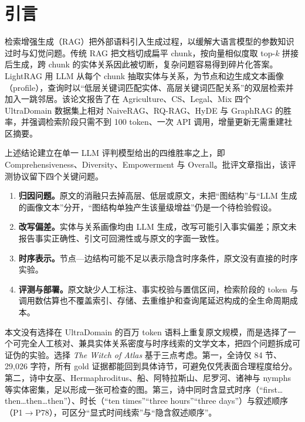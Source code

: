 \documentclass[11pt,a4paper]{ctexart}
\begin{document}
\section{引言}

检索增强生成（RAG）把外部语料引入生成过程，以缓解大语言模型的参数知识过时与幻觉问题\citep{lewis2020rag}。传统 RAG 把文档切成扁平 chunk，按向量相似度取 top-$k$ 拼接后生成，跨 chunk 的实体关系因此被切断，复杂问题容易得到碎片化答案。LightRAG\citep{guo2024lightrag} 用 LLM 从每个 chunk 抽取实体与关系，为节点和边生成文本画像（profile），查询时以“低层关键词匹配实体、高层关键词匹配关系”的双层检索并加入一跳邻居。该论文报告了在 Agriculture、CS、Legal、Mix 四个 UltraDomain 数据集上相对 NaiveRAG、RQ-RAG、HyDE 与 GraphRAG 的胜率，并强调检索阶段只需不到 100 token、一次 API 调用，增量更新无需重建社区摘要。

上述结论建立在单一 LLM 评判模型给出的四维胜率之上，即 Comprehensiveness、Diversity、Empowerment 与 Overall。批评文章\citep{blog2026lightrag}指出，该评测协议留下四个关键问题。

\begin{enumerate}
\item \textbf{归因问题。}原文的消融只去掉高层、低层或原文，未把“图结构”与“LLM 生成的画像文本”分开，“图结构单独产生该量级增益”仍是一个待检验假设。
\item \textbf{改写偏差。}实体与关系画像均由 LLM 生成，改写可能引入事实偏差；原文未报告事实正确性、引文可回溯性或与原文的字面一致性。
\item \textbf{时序表示。}节点—边结构可能不足以表示隐含时序条件，原文没有直接的时序实验。
\item \textbf{评测与部署。}原文缺少人工标注、事实校验与置信区间，检索阶段的 token 与调用数估算也不覆盖索引、存储、去重维护和查询尾延迟构成的全生命周期成本。
\end{enumerate}

本文没有选择在 UltraDomain 的百万 token 语料上重复原文规模，而是选择了一个可完全人工核对、兼具实体关系密度与时序线索的文学文本，把四个问题拆成可证伪的实验。选择 \emph{The Witch of Atlas}\citep{shelley1824witch} 基于三点考虑。第一，全诗仅 84 节、29,026 字符，所有 gold 证据都能回到具体诗节，可避免仅凭表面合理程度给分。第二，诗中女巫、Hermaphroditus、船、阿特拉斯山、尼罗河、诸神与 nymphs 等实体密集，足以形成一张可检查的图。第三，诗中同时含显式时序（“first\ldots then\ldots then\ldots then”）、时长（“ten times”“three hours”“three days”）与叙述顺序（P1$\to$P78），可区分“显式时间线索”与“隐含叙述顺序”。
\end{document}
